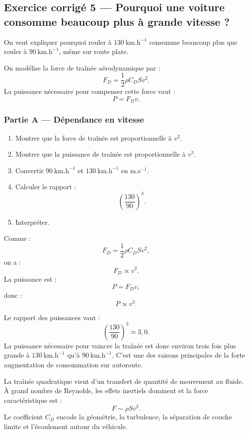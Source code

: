 \documentclass[11pt,a4paper]{article}
\begin{document}
\subsection{Exercice corrigé 5 — Pourquoi une voiture consomme beaucoup plus à grande vitesse ?}

\begin{exercicebox}
On veut expliquer pourquoi rouler à \(130\ \mathrm{km.h^{-1}}\) consomme beaucoup plus que rouler à \(90\ \mathrm{km.h^{-1}}\), même sur route plate.

On modélise la force de traînée aérodynamique par :
\[
F_D=\frac12\rho C_DSv^2.
\]
La puissance nécessaire pour compenser cette force vaut :
\[
P=F_Dv.
\]
\end{exercicebox}

\subsubsection*{Partie A — Dépendance en vitesse}

\begin{enumerate}
  \item Montrer que la force de traînée est proportionnelle à \(v^2\).
  \item Montrer que la puissance de traînée est proportionnelle à \(v^3\).
  \item Convertir \(90\ \mathrm{km.h^{-1}}\) et \(130\ \mathrm{km.h^{-1}}\) en \(\mathrm{m.s^{-1}}\).
  \item Calculer le rapport :
  \[
  \left(\frac{130}{90}\right)^3.
  \]
  \item Interpréter.
\end{enumerate}

\begin{corrigebox}
Comme :
\[
F_D=\frac12\rho C_DSv^2,
\]
on a :
\[
F_D\propto v^2.
\]
La puissance est :
\[
P=F_Dv,
\]
donc :
\[
P\propto v^3.
\]

Le rapport des puissances vaut :
\[
\left(\frac{130}{90}\right)^3\simeq3{,}0.
\]
La puissance nécessaire pour vaincre la traînée est donc environ trois fois plus grande à \(130\ \mathrm{km.h^{-1}}\) qu'à \(90\ \mathrm{km.h^{-1}}\). C'est une des raisons principales de la forte augmentation de consommation sur autoroute.
\end{corrigebox}

\begin{approfondissementbox}
La traînée quadratique vient d'un transfert de quantité de mouvement au fluide. À grand nombre de Reynolds, les effets inertiels dominent et la force caractéristique est :
\[
F\sim \rho S v^2.
\]
Le coefficient \(C_D\) encode la géométrie, la turbulence, la séparation de couche limite et l'écoulement autour du véhicule.
\end{approfondissementbox}
\end{document}
